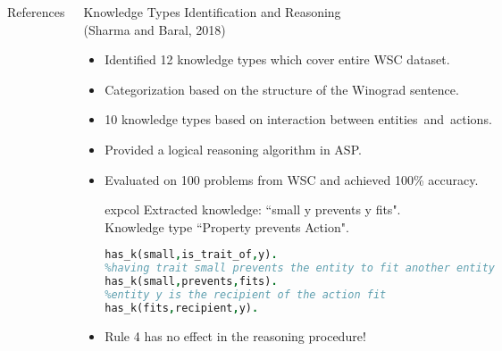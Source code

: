 \documentclass[svgnames, final, 20pt]{beamer} %
\begin{document}
\begin{frame}[fragile]
\begin{columns}[t]
\begin{block}{References}
	
	\tiny{
		
	}
\end{block}



\begin{block}{Knowledge Types Identification and Reasoning\\(Sharma and Baral, 2018)}
\vspace{0.4cm}
\begin{itemize}
	\item Identified 12 {\color{myorange}knowledge types} which cover entire WSC dataset.
	\item Categorization based on the structure of the Winograd sentence.
	\item 10 knowledge types based on interaction between entities~and~actions.  
	\item Provided a {\color{myorange}logical reasoning algorithm} in ASP.
	\item Evaluated on 100 problems from WSC and achieved {\color{myorange}100\%} accuracy.


\begin{beamercolorbox}[rounded=true,sep=0.3cm]{expcol}
Extracted knowledge: ``small y prevents y fits". \\
Knowledge type ``Property prevents Action".\\
\begin{lstlisting}[language = Prolog, style=SC, numbers=right,
numberstyle=\tiny]
%entity y has a trait small
has_k(small,is_trait_of,y). 		
%having trait small prevents the entity to fit another entity
has_k(small,prevents,fits).	 	
%entity y is the recipient of the action fit
has_k(fits,recipient,y).		
\end{lstlisting}
\end{beamercolorbox}
\item Rule 4 {\color{myorange}has no effect} in the reasoning procedure!


\end{itemize}
\end{block}
\end{columns}
\end{frame}
\end{document}
